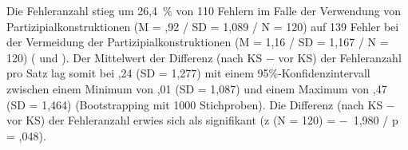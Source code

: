 Die Fehleranzahl stieg um 26,4~\% von 110 Fehlern im Falle der Verwendung von Partizipialkonstruktionen (M = ,92 / SD = 1,089 / N = 120) auf 139 Fehler bei der Vermeidung der Partizipialkonstruktionen (M = 1,16 / SD = 1,167 / N = 120) ( und ). Der Mittelwert der Differenz (nach KS $-$ vor KS) der Fehleranzahl pro Satz lag somit bei ,24 (SD = 1,277) mit einem 95\%\nobreakdash-Kon\-fi\-denz\-in\-ter\-vall zwischen einem Minimum von ,01 (SD = 1,087) und einem Maximum von ,47 (SD = 1,464) (Bootstrapping mit 1000 Stichproben). Die Differenz (nach KS $-$ vor KS) der Fehleranzahl erwies sich als signifikant (z (N = 120) = $-$~1,980 / p = ,048).


\begin{figure}
















\captionsetup{width=.45\textwidth}
\begin{floatrow}
%
%
\end{floatrow}
\end{figure}

